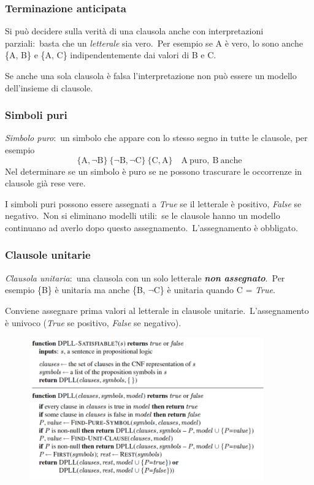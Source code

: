 \subsubsection{Terminazione anticipata}

Si può decidere sulla verità di una clausola anche con interpretazioni parziali:\ basta che un \textit{letterale} sia vero.\ Per esempio se A è vero, lo sono anche \{A, B\} e \{A, C\} indipendentemente dai valori di B e C.\

Se anche una sola clausola è falsa l'interpretazione non può essere un modello dell'insieme di clausole.\

\subsubsection{Simboli puri}

\textit{Simbolo puro}:\ un simbolo che appare con lo stesso segno in tutte le clausole, per esempio
\[ \{\mathrm{A}, \lnot \mathrm{B}\}\ \{\lnot \mathrm{B}, \lnot \mathrm{C}\}\ \{\mathrm{C}, \mathrm{A}\} \quad \mathrm{A\ puro,\ B\ anche}\]
Nel determinare se un simbolo è puro se ne possono trascurare le occorrenze in clausole già rese vere.\

I simboli puri possono essere assegnati a \textit{True} se il letterale è positivo, \textit{False} se negativo.\
Non si eliminano modelli utili:\ se le clausole hanno un modello continuano ad averlo dopo questo assegnamento.\ L'assegnamento è obbligato.

\subsubsection{Clausole unitarie}

\textit{Clausola unitaria}:\ una clausola con un solo letterale \textbf{\textit{non assegnato}}.\ Per esempio \{B\} è unitaria ma anche \{B, $\lnot$C\} è unitaria quando C = \textit{True}.

Conviene assegnare prima valori al letterale in clausole unitarie.\ L'assegnamento è univoco (\textit{True} se positivo, \textit{False} se negativo).
\begin{figure}[H]
	\centering
	\includegraphics[width=0.9\textwidth]{immagini/DPLL.png}
\end{figure}

